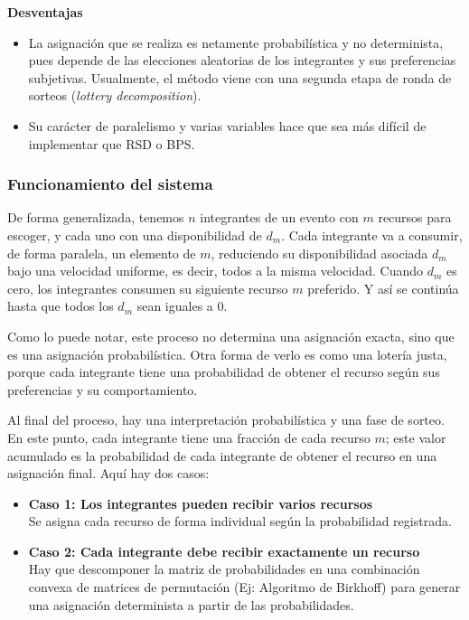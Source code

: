 \documentclass{article}
\begin{document}
\textbf{Desventajas}

\begin{itemize}
  \item La asignación que se realiza es netamente probabilística y no determinista, pues depende 
        de las elecciones aleatorias de los integrantes y sus preferencias subjetivas. Usualmente, el
        método viene con una segunda etapa de ronda de sorteos (\textit{lottery decomposition}).
  \item Su carácter de paralelismo y varias variables hace que sea más difícil de implementar que
        RSD o BPS.
\end{itemize}

\subsubsection{Funcionamiento del sistema}

De forma generalizada, tenemos $n$ integrantes de un evento con $m$ recursos para escoger, y cada uno con 
una disponibilidad de $d_{m}$. Cada integrante va a consumir, de forma paralela, un elemento de $m$, 
reduciendo su
disponibilidad asociada $d_{m}$ bajo una velocidad uniforme, es decir, todos a la misma velocidad.
Cuando $d_{m}$ es cero, los integrantes consumen su siguiente recurso $m$ preferido. Y así se continúa
hasta que todos los $d_{m}$ sean iguales a 0.

Como lo puede notar, este proceso no determina una asignación exacta, sino que es una asignación
probabilística. Otra forma de verlo es como una lotería justa, porque cada integrante tiene una 
probabilidad de obtener el recurso según sus preferencias y su comportamiento.

Al final del proceso, hay una interpretación probabilística y una fase de sorteo. En este punto, cada
integrante tiene una fracción de cada recurso $m$; este valor acumulado es la probabilidad de 
cada integrante de obtener el recurso en una asignación final. Aquí hay dos casos:\\

\begin{itemize}
  \item \textbf{Caso 1: Los integrantes pueden recibir varios recursos}\\
        Se asigna cada recurso de forma individual según la probabilidad registrada.
  \item \textbf{Caso 2: Cada integrante debe recibir exactamente un recurso}\\
        Hay que descomponer la matriz de probabilidades en una combinación convexa de matrices
        de permutación (Ej: Algoritmo de Birkhoff) para generar una asignación determinista a partir de las probabilidades.
\end{itemize}
\end{document}
